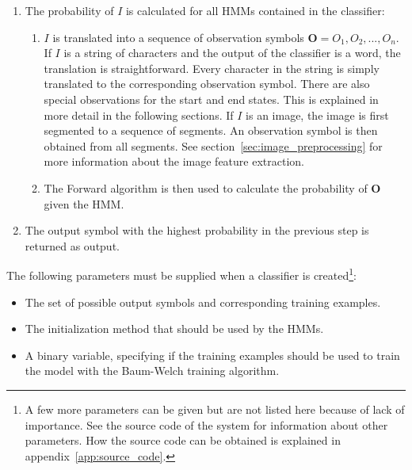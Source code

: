 \begin{enumerate}
  \item The probability of $I$ is calculated for all HMMs contained in the classifier:
    \begin{enumerate}
      \item $I$ is translated into a sequence of observation symbols $\mathbf{O} = O_{1},O_{2},...,O_{n}$. 
      If $I$ is a string of characters and the output of the classifier is a word, the translation is straightforward. 
      Every character in the string is simply translated to the corresponding observation symbol. 
      There are also special observations for the start and end states. 
      This is explained in more detail in the following sections. 
      If $I$ is an image, the image is first segmented to a sequence of segments. 
      An observation symbol is then obtained from all segments. 
      See section~\ref{sec:image_preprocessing} for more information about the image feature extraction.
      \item The Forward algorithm \cite{Rabiner1989} is then used to calculate the probability of $\mathbf{O}$ given the HMM.
    \end{enumerate}
  \item The output symbol with the highest probability in the previous step is returned as output.
\end{enumerate}
 
The following parameters must be supplied when a classifier is created\footnote{A few more parameters can be given but are not listed here because of lack of importance. See the source code of the system for information about other parameters. How the source code can be obtained is explained in appendix~\ref{app:source_code}.}:
\begin{itemize}
 \item The set of possible output symbols and corresponding training examples.
 \item The initialization method that should be used by the HMMs.
 \item A binary variable, specifying if the training examples should be used to train the model with the Baum-Welch \cite{Rabiner1989} training algorithm.
\end{itemize}
